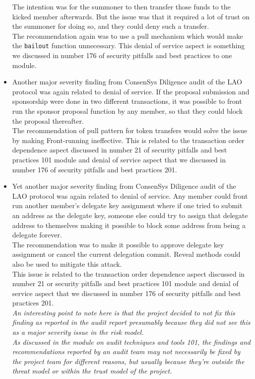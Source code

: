 \begin{itemize}
  The intention was for the summoner to then transfer those funds to the
  kicked member afterwards. But the issue was that it required a lot of
  trust on the summoner for doing so, and they could deny such a
  transfer.\\

  The recommendation again was to use a pull mechanism which would make
  the \texttt{bailout} function unnecessary. This denial of service
  aspect is something we discussed in number 176 of security pitfalls
  and best practices to one module.
\item
  Another major severity finding from ConsenSys Diligence audit of the
  LAO protocol was again related to denial of service. If the proposal
  submission and sponsorship were done in two different transactions, it
  was possible to front run the sponsor proposal function by any member,
  so that they could block the proposal thereafter.\\

  The recommendation of pull pattern for token transfers would solve the
  issue by making Front-running ineffective. This is related to the
  transaction order dependence aspect discussed in number 21 of security
  pitfalls and best practices 101 module and denial of service aspect
  that we discussed in number 176 of security pitfalls and best
  practices 201.
\item
  Yet another major severity finding from ConsenSys Diligence audit of
  the LAO protocol was again related to denial of service. Any member
  could front run another member's delegate key assignment where if one
  tried to submit an address as the delegate key, someone else could try
  to assign that delegate address to themselves making it possible to
  block some address from being a delegate forever.\\

  The recommendation was to make it possible to approve delegate key
  assignment or cancel the current delegation commit. Reveal methods
  could also be used to mitigate this attack.\\

  This issue is related to the transaction order dependence aspect
  discussed in number 21 or security pitfalls and best practices 101
  module and denial of service aspect that we discussed in number 176 of
  security pitfalls and best practices 201.\\

  \emph{An interesting point to note here is that the project decided to
  not fix this finding as reported in the audit report presumably
  because they did not see this as a major severity issue in the risk
  model.}\\

  \emph{As discussed in the module on audit techniques and tools 101,
  the findings and recommendations reported by an audit team may not
  necessarily be fixed by the project team for different reasons, but
  usually because they're outside the threat model or within the trust
  model of the project.}
\end{itemize}

